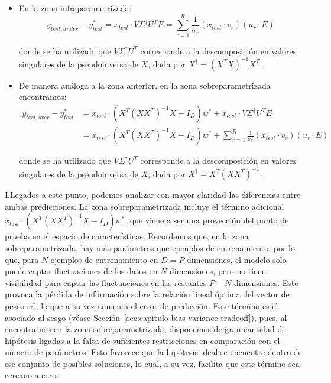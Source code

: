 \begin{itemize}
    \item En la zona infraparametrizada:
        \[
            y_{test, under} - y_{test}^{*} = x_{test} \cdot V \Sigma^{\dagger} U^{T} E = \sum_{r=1}^{R}\frac{1}{\sigma_r}(x_{test} \cdot v_r)(u_r \cdot E)
        \]

        donde se ha utilizado que $V \Sigma^{\dagger} U^{T}$ corresponde a la descomposición en valores singulares de la pseudoinversa de $X$, dada por $X^{\dagger} = {(X^T X)}^{-1} X^T$.

    \item De manera análoga a la zona anterior, en la zona sobreparametrizada encontramos: 
        \[
            \begin{aligned}
                y_{test, over} - y_{test}^{*} &= x_{test} \cdot (X^{T}{(XX^{T})}^{-1}X - I_{D}) w^{*} 
                + x_{test} \cdot V \Sigma^{\dagger} U^{T} E \\
                &= x_{test} \cdot (X^{T}{(XX^{T})}^{-1}X - I_{D}) w^{*} 
                + \sum_{r=1}^{R}\frac{1}{\sigma_r}(x_{test} \cdot v_r)(u_r \cdot E)
            \end{aligned}
        \]

        donde se ha utilizado que $V \Sigma^{\dagger} U^{T}$ corresponde a la descomposición en valores singulares de la pseudoinversa de $X$, dada por $X^{\dagger} = X^{T}{(XX^{T})}^{-1}$.\newline
\end{itemize}

LLegados a este punto, podemos analizar con mayor claridad las diferencias entre ambas predicciones. La zona sobreparametrizada incluye el término adicional $x_{test} \cdot (X^{T}{(XX^{T})}^{-1}X - I_{D}) w^{*}$, que viene a ser una proyección del punto de prueba en el espacio de características. Recordemos que, en la zona sobreparametrizada, hay más parámetros que ejemplos de entrenamiento, por lo que, para $N$ ejemplos de entrenamiento en $D = P$ dimensiones, el modelo solo puede captar fluctuaciones de los datos en $N$ dimensiones, pero no tiene visibilidad para captar las fluctuaciones en las restantes $P - N$ dimensiones. Esto provoca la pérdida de información sobre la relación lineal óptima del vector de pesos $w^{*}$, lo que a su vez aumenta el error de predicción. Este término es el asociado al sesgo (véase Sección~\ref{sec:capitulo-bias-variance-tradeoff}), pues, al encontrarnos en la zona sobreparametrizada, disponemos de gran cantidad de hipótesis ligadas a la falta de suficientes restricciones en comparación con el número de parámetros. Esto favorece que la hipótesis ideal se encuentre dentro de ese conjunto de posibles soluciones, lo cual, a su vez, facilita que este término sea cercano a cero.\newline


